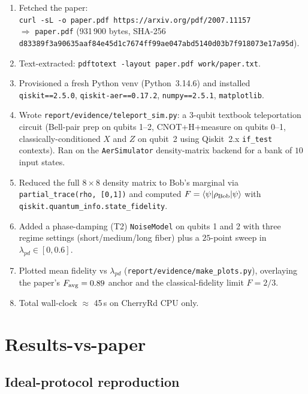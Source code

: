 \documentclass[11pt]{article}
\begin{document}
\begin{enumerate}
\item Fetched the paper: \\
\verb|curl -sL -o paper.pdf https://arxiv.org/pdf/2007.11157| \\
$\Rightarrow$ \texttt{paper.pdf} (931\,900 bytes, SHA-256
\texttt{d83389f3a90635aaf84e45d1c7674ff99ae047abd5140d03b7f918073e17a95d}).
\item Text-extracted: \verb|pdftotext -layout paper.pdf work/paper.txt|.
\item Provisioned a fresh Python venv (Python~3.14.6) and installed
      \verb|qiskit==2.5.0|, \verb|qiskit-aer==0.17.2|, \verb|numpy==2.5.1|,
      \verb|matplotlib|.
\item Wrote \verb|report/evidence/teleport_sim.py|: a $3$-qubit textbook
      teleportation circuit (Bell-pair prep on qubits 1--2, CNOT+H+measure on
      qubits 0--1, classically-conditioned $X$ and $Z$ on qubit~2 using
      Qiskit~2.x \verb|if_test| contexts). Ran on the \texttt{AerSimulator}
      density-matrix backend for a bank of $10$ input states.
\item Reduced the full $8\times 8$ density matrix to Bob's marginal via
      \verb|partial_trace(rho, [0,1])| and computed
      $F = \langle\psi|\rho_{\rm Bob}|\psi\rangle$ with
      \verb|qiskit.quantum_info.state_fidelity|.
\item Added a phase-damping (T2) \verb|NoiseModel| on qubits 1 and 2 with
      three regime settings (short/medium/long fiber) plus a $25$-point sweep
      in $\lambda_{pd} \in [0, 0.6]$.
\item Plotted mean fidelity vs $\lambda_{pd}$
      (\verb|report/evidence/make_plots.py|), overlaying the paper's
      $F_{\rm avg} = 0.89$ anchor and the classical-fidelity limit $F = 2/3$.
\item Total wall-clock $\approx$ 45\,s on CherryRd CPU only.
\end{enumerate}

\section{Results-vs-paper}

\subsection{Ideal-protocol reproduction}
\end{document}
